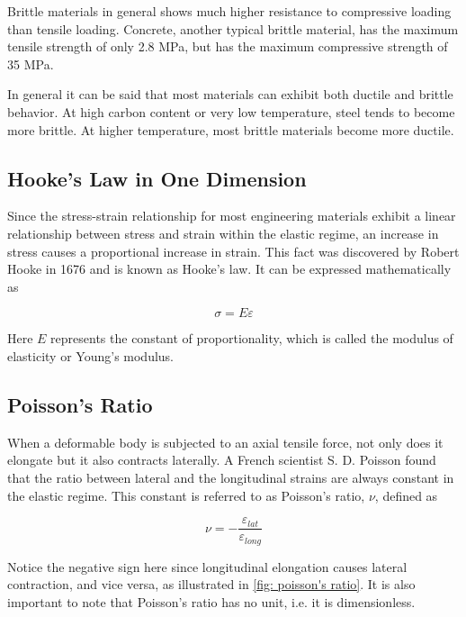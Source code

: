 \documentclass[
10pt,
a4paper,
openany,
svgnames,
]{book} %
\begin{document}
Brittle materials in general shows much higher resistance to compressive loading than tensile loading. Concrete, another typical brittle material, has the maximum tensile strength of only 2.8 MPa, but has the maximum compressive strength of 35 MPa.

In general it can be said that most materials can exhibit both ductile and brittle behavior. At high carbon content or very low temperature, steel tends to become more brittle. At higher temperature, most brittle materials become more ductile.

\subsection{Hooke’s Law in One Dimension}

Since the stress-strain relationship for most engineering materials exhibit a linear relationship between stress and strain within the elastic regime, an increase in stress causes a proportional increase in strain. This fact was discovered by Robert Hooke in 1676 and is known as Hooke’s law. It can be expressed mathematically as

\begin{equation}
  \sigma  = E\varepsilon
\end{equation}

Here $E$ represents the constant of proportionality, which is called the modulus of elasticity or Young’s modulus.

\subsection{Poisson’s Ratio}

When a deformable body is subjected to an axial tensile force, not only does it elongate but it also contracts laterally. A French scientist S. D. Poisson found that the ratio between lateral and the longitudinal strains are always constant in the elastic regime. This constant is referred to as Poisson’s ratio, $\nu$, defined as

\begin{equation}
  \nu  =  - \frac{\varepsilon _{lat}}{\varepsilon _{long}}
\end{equation}
  
Notice the negative sign here since longitudinal elongation causes lateral contraction, and vice versa, as illustrated in \cref{fig: poisson's ratio}. It is also important to note that Poisson’s ratio has no unit, i.e. it is dimensionless. 
\end{document}
